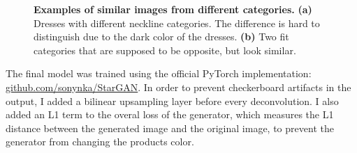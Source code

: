 \documentclass[12pt]{report}
\begin{document}
\begin{figure}[h]
\centering
{}
\vspace{0.2cm}
\caption{\label{fig:problem_data} \textbf{Examples of similar images from different categories.} \textbf{(a)} Dresses with different neckline categories. The difference is hard to distinguish due to the dark color of the dresses. \textbf{(b)} Two fit categories that are supposed to be opposite, but look similar.}
\end{figure}

The final model was trained using the official PyTorch implementation: \linebreak \hyperlink{https://github.com/sonynka/StarGAN}{github.com/sonynka/StarGAN}. In order to prevent checkerboard artifacts in the output, I added a bilinear upsampling layer before every deconvolution. I also added an L1 term to the overal loss of the generator, which measures the L1 distance between the generated image and the original image, to prevent the generator from changing the products color.
\end{document}
